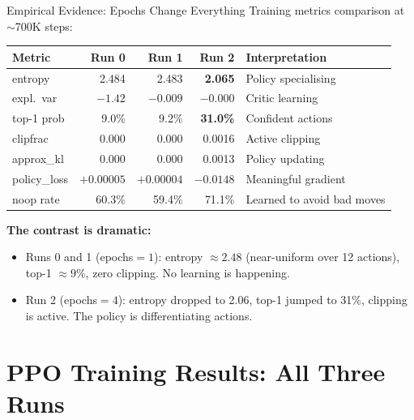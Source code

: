 \documentclass[aspectratio=169,11pt]{beamer}
\begin{document}
\begin{frame}{Empirical Evidence: Epochs Change Everything}
  \small
  Training metrics comparison at $\sim$700K steps:

  \begin{center}
  \footnotesize
  \begin{tabular}{lrrrl}
    \toprule
    \textbf{Metric} & \textbf{Run 0} & \textbf{Run 1} & \textbf{Run 2} & \textbf{Interpretation} \\
    \midrule
    entropy     & 2.484 & 2.483 & \textcolor{good}{\textbf{2.065}} & Policy specialising \\
    expl.\ var  & \textcolor{bad}{$-1.42$} & $-0.009$ & \textcolor{good}{$-0.000$} & Critic learning \\
    top-1 prob  & 9.0\% & 9.2\% & \textcolor{good}{\textbf{31.0\%}} & Confident actions \\
    clipfrac    & 0.000 & 0.000 & 0.0016 & Active clipping \\
    approx\_kl  & 0.000 & 0.000 & 0.0013 & Policy updating \\
    policy\_loss& $+0.00005$ & $+0.00004$ & \textcolor{good}{$-0.0148$} & Meaningful gradient \\
    noop rate   & 60.3\% & 59.4\% & 71.1\% & Learned to avoid bad moves \\
    \bottomrule
  \end{tabular}
  \end{center}

  \bigskip
  \textbf{The contrast is dramatic:}
  \begin{itemize}
    \item Runs 0 and 1 (epochs${}=1$): entropy $\approx 2.48$ (near-uniform over 12 actions),
      top-1 $\approx 9\%$, zero clipping. \alert{No learning is happening.}
    \item Run 2 (epochs${}=4$): entropy dropped to 2.06, top-1 jumped to 31\%,
      clipping is active. \textcolor{good}{The policy is differentiating actions.}
  \end{itemize}
\end{frame}

\section{PPO Training Results: All Three Runs}
\end{document}
